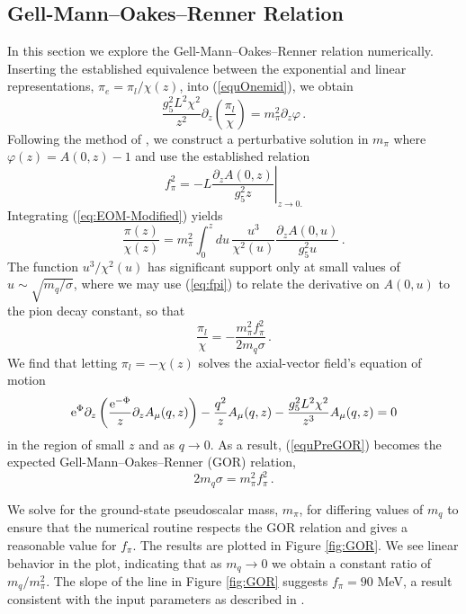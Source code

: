 \subsection{Gell-Mann--Oakes--Renner Relation}

In this section we explore the Gell-Mann--Oakes--Renner relation numerically.
Inserting the established equivalence between the exponential and linear representations, $\pi_{e}=\pi_{l}/\chi(z)$, into (\ref{equOnemid}), we obtain 
\begin{equation}
\frac{g_{5}^{2}L^{2}\chi^{2}}{z^{2}}\partial_{z}\left(\frac{\pi_{l}}{\chi}\right)=m_{\pi}^{2}\partial_{z}\varphi\,.\label{eq:EOM-Modified}
\end{equation}
 Following the method of \cite{stephanov-katz-son}, we construct a perturbative solution in $m_{\pi}$ where $\varphi(z)=A(0,z)-1$ and use the established relation
\begin{equation}
f_{\pi}^{2}=-\left.L\frac{\partial_{z}A(0,z)}{g_{5}^{2}z}\right|_{z\rightarrow0.}\label{eq:fpi}
\end{equation}
Integrating (\ref{eq:EOM-Modified}) yields 
\begin{equation}
\frac{\pi(z)}{\chi(z)}=m_{\pi}^{2}\int_{0}^{z}du\,\frac{u^{3}}{\chi^{2}(u)}\frac{\partial_{z}A(0,u)}{g_{5}^{2}u}\,.
\end{equation}
The function $u^{3}/\chi^{2}(u)$ has significant support only at small values of $u\sim\sqrt{m_{q}/\sigma}$, where we may use (\ref{eq:fpi}) to relate the derivative on $A(0,u)$ to the pion decay constant, so that 
\begin{equation}
\frac{\pi_{l}}{\chi}=-\frac{m_{\pi}^{2}f_{\pi}^{2}}{2m_{q}\sigma}\,.\label{equPreGOR}
\end{equation}
We find that letting $\pi_{l}=-\chi(z)$ solves the axial-vector field's equation of motion 
\begin{equation}
{\rm e}^{\Phi}\partial_{z}\left(\frac{{\rm e}^{-\Phi}}{z}\partial_{z}A_{\mu}(q,z)\right)-\frac{q^{2}}{z}A_{\mu}(q,z)-\frac{g_{5}^{2}L^{2}\chi^{2}}{z^{3}}A_{\mu}(q,z)=0
\end{equation}
 in the region of small $z$ and as $q\rightarrow0$. 
 As a result, (\ref{equPreGOR}) becomes the expected Gell-Mann--Oakes--Renner (GOR)
relation, 
\begin{equation}
2m_{q}\sigma=m_{\pi}^{2}f_{\pi}^{2}\,.\label{eq:GOR}
\end{equation}

We solve for the ground-state pseudoscalar mass, $m_{\pi}$, for
differing values of $m_{q}$ to ensure that the numerical routine
respects the GOR relation and gives a reasonable value for $f_{\pi}$.
The results are plotted in Figure \ref{fig:GOR}. We see linear behavior
in the plot, indicating that as $m_{q}\rightarrow0$ we obtain a constant
ratio of $m_{q}/m_{\pi}^{2}$. The slope of the line in Figure \ref{fig:GOR}
suggests $f_{\pi}=90$ MeV, a result consistent with the input parameters
as described in \cite{gherghetta-kelley}.


